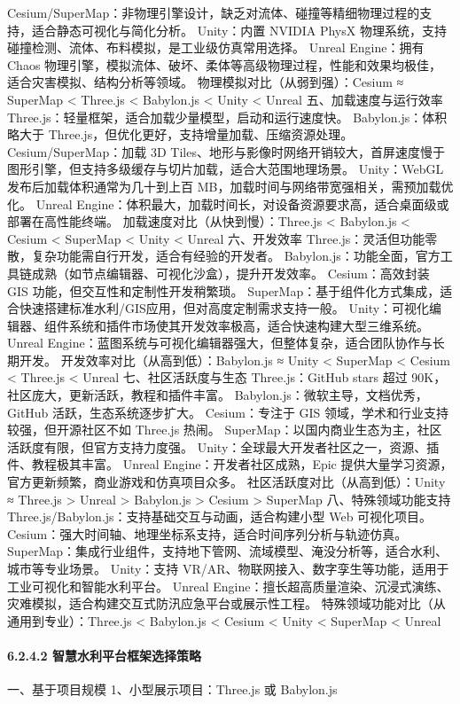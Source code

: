 Cesium/SuperMap：非物理引擎设计，缺乏对流体、碰撞等精细物理过程的支持，适合静态可视化与简化分析。 Unity：内置 NVIDIA PhysX 物理系统，支持碰撞检测、流体、布料模拟，是工业级仿真常用选择。 Unreal Engine：拥有 Chaos 物理引擎，模拟流体、破坏、柔体等高级物理过程，性能和效果均极佳，适合灾害模拟、结构分析等领域。 物理模拟对比（从弱到强）：Cesium ≈ SuperMap \textless{} Three.js \textless{} Babylon.js \textless{} Unity \textless{} Unreal 五、加载速度与运行效率 Three.js：轻量框架，适合加载少量模型，启动和运行速度快。 Babylon.js：体积略大于 Three.js，但优化更好，支持增量加载、压缩资源处理。 Cesium/SuperMap：加载 3D Tiles、地形与影像时网络开销较大，首屏速度慢于图形引擎，但支持多级缓存与切片加载，适合大范围地理场景。 Unity：WebGL 发布后加载体积通常为几十到上百 MB，加载时间与网络带宽强相关，需预加载优化。 Unreal Engine：体积最大，加载时间长，对设备资源要求高，适合桌面级或部署在高性能终端。 加载速度对比（从快到慢）：Three.js \textless{} Babylon.js \textless{} Cesium \textless{} SuperMap \textless{} Unity \textless{} Unreal 六、开发效率 Three.js：灵活但功能零散，复杂功能需自行开发，适合有经验的开发者。 Babylon.js：功能全面，官方工具链成熟（如节点编辑器、可视化沙盒），提升开发效率。 Cesium：高效封装 GIS 功能，但交互性和定制性开发稍繁琐。 SuperMap：基于组件化方式集成，适合快速搭建标准水利/GIS应用，但对高度定制需求支持一般。 Unity：可视化编辑器、组件系统和插件市场使其开发效率极高，适合快速构建大型三维系统。 Unreal Engine：蓝图系统与可视化编辑器强大，但整体复杂，适合团队协作与长期开发。 开发效率对比（从高到低）：Babylon.js ≈ Unity \textless{} SuperMap \textless{} Cesium \textless{} Three.js \textless{} Unreal 七、社区活跃度与生态 Three.js：GitHub stars 超过 90K，社区庞大，更新活跃，教程和插件丰富。 Babylon.js：微软主导，文档优秀，GitHub 活跃，生态系统逐步扩大。 Cesium：专注于 GIS 领域，学术和行业支持较强，但开源社区不如 Three.js 热闹。 SuperMap：以国内商业生态为主，社区活跃度有限，但官方支持力度强。 Unity：全球最大开发者社区之一，资源、插件、教程极其丰富。 Unreal Engine：开发者社区成熟，Epic 提供大量学习资源，官方更新频繁，商业游戏和仿真项目众多。 社区活跃度对比（从高到低）：Unity ≈ Three.js \textgreater{} Unreal \textgreater{} Babylon.js \textgreater{} Cesium \textgreater{} SuperMap 八、特殊领域功能支持 Three.js/Babylon.js：支持基础交互与动画，适合构建小型 Web 可视化项目。 Cesium：强大时间轴、地理坐标系支持，适合时间序列分析与轨迹仿真。 SuperMap：集成行业组件，支持地下管网、流域模型、淹没分析等，适合水利、城市等专业场景。 Unity：支持 VR/AR、物联网接入、数字孪生等功能，适用于工业可视化和智能水利平台。 Unreal Engine：擅长超高质量渲染、沉浸式演练、灾难模拟，适合构建交互式防汛应急平台或展示性工程。 特殊领域功能对比（从通用到专业）：Three.js \textless{} Babylon.js \textless{} Cesium \textless{} Unity \textless{} SuperMap \textless{} Unreal \paragraph{6.2.4.2 智慧水利平台框架选择策略}\label{ux667aux6167ux6c34ux5229ux5e73ux53f0ux6846ux67b6ux9009ux62e9ux7b56ux7565} 一、基于项目规模 1、小型展示项目：Three.js 或 Babylon.js 
